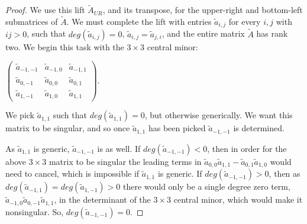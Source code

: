 \documentclass{article}
\begin{document}
\begin{proof}
  We use this lift $\tilde{A}_{UR}$, and its transpose, for the upper-right and bottom-left submatrices of $\tilde{A}$. We must complete the lift with entries $\tilde{a}_{i,j}$ for every $i,j$ with $ij > 0$, such that $deg(\tilde{a}_{i,j}) = 0$, $\tilde{a}_{i,j} = \tilde{a}_{j,i}$, and the entire matrix $\tilde{A}$ has rank two. We begin this task with the $3 \times 3$ central minor:

  \begin{center}
    $\left(\begin{array}{ccc} \tilde{a}_{-1,-1} & \tilde{a}_{-1,0} & \tilde{a}_{-1,1} \\ \tilde{a}_{0,-1} & \tilde{a}_{0,0} & \tilde{a}_{0,1} \\ \tilde{a}_{1,-1} & \tilde{a}_{1,0} & \tilde{a}_{1,1} \end{array}\right)$.
  \end{center}
  
  We pick $\tilde{a}_{1,1}$ such that $deg(\tilde{a}_{1,1}) = 0$, but otherwise generically. We want this matrix to be singular, and so once $\tilde{a}_{1,1}$ has been picked $\tilde{a}_{-1,-1}$ is determined. 

  As $\tilde{a}_{1,1}$ is generic, $\tilde{a}_{-1,-1}$ is as well. If $deg(\tilde{a}_{-1,-1}) < 0$, then in order for the above $3 \times 3$ matrix to be singular the leading terms in $\tilde{a}_{0,0}\tilde{a}_{1,1}-\tilde{a}_{0,1}\tilde{a}_{1,0}$ would need to cancel, which is impossible if $\tilde{a}_{1,1}$ is generic. If $deg(\tilde{a}_{-1,-1}) > 0$, then as $deg(\tilde{a}_{-1,1}) = deg(\tilde{a}_{1,-1}) > 0$ there would only be a single degree zero term, $\tilde{a}_{-1,0}\tilde{a}_{0,-1}\tilde{a}_{1,1}$, in the determinant of the $3 \times 3$ central minor, which would make it nonsingular. So, $deg(\tilde{a}_{-1,-1}) = 0$. 


\end{proof}
\end{document}
